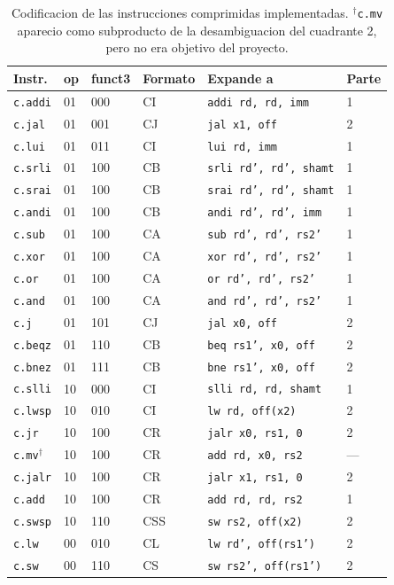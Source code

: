 \documentclass[11pt,a4paper]{article}
\begin{document}
\begin{table}[H]
	\centering
	\small
	\begin{tabular}{@{}llllll@{}}
		\toprule
		\textbf{Instr.} & \textbf{op} & \textbf{funct3} & \textbf{Formato} & \textbf{Expande a} & \textbf{Parte} \\
		\midrule
		\texttt{c.addi} & 01 & 000 & CI  & \texttt{addi rd, rd, imm}       & 1 \\
		\texttt{c.jal}  & 01 & 001 & CJ  & \texttt{jal x1, off}            & 2 \\
		\texttt{c.lui}  & 01 & 011 & CI  & \texttt{lui rd, imm}            & 1 \\
		\texttt{c.srli} & 01 & 100 & CB  & \texttt{srli rd', rd', shamt}   & 1 \\
		\texttt{c.srai} & 01 & 100 & CB  & \texttt{srai rd', rd', shamt}   & 1 \\
		\texttt{c.andi} & 01 & 100 & CB  & \texttt{andi rd', rd', imm}     & 1 \\
		\texttt{c.sub}  & 01 & 100 & CA  & \texttt{sub rd', rd', rs2'}     & 1 \\
		\texttt{c.xor}  & 01 & 100 & CA  & \texttt{xor rd', rd', rs2'}     & 1 \\
		\texttt{c.or}   & 01 & 100 & CA  & \texttt{or rd', rd', rs2'}      & 1 \\
		\texttt{c.and}  & 01 & 100 & CA  & \texttt{and rd', rd', rs2'}     & 1 \\
		\texttt{c.j}    & 01 & 101 & CJ  & \texttt{jal x0, off}            & 2 \\
		\texttt{c.beqz} & 01 & 110 & CB  & \texttt{beq rs1', x0, off}      & 2 \\
		\texttt{c.bnez} & 01 & 111 & CB  & \texttt{bne rs1', x0, off}      & 2 \\
		\texttt{c.slli} & 10 & 000 & CI  & \texttt{slli rd, rd, shamt}     & 1 \\
		\texttt{c.lwsp} & 10 & 010 & CI  & \texttt{lw rd, off(x2)}         & 2 \\
		\texttt{c.jr}   & 10 & 100 & CR  & \texttt{jalr x0, rs1, 0}        & 2 \\
		\texttt{c.mv}$^\dagger$ & 10 & 100 & CR & \texttt{add rd, x0, rs2} & --- \\
		\texttt{c.jalr} & 10 & 100 & CR  & \texttt{jalr x1, rs1, 0}        & 2 \\
		\texttt{c.add}  & 10 & 100 & CR  & \texttt{add rd, rd, rs2}        & 1 \\
		\texttt{c.swsp} & 10 & 110 & CSS & \texttt{sw rs2, off(x2)}        & 2 \\
		\texttt{c.lw}   & 00 & 010 & CL  & \texttt{lw rd', off(rs1')}      & 2 \\
		\texttt{c.sw}   & 00 & 110 & CS  & \texttt{sw rs2', off(rs1')}     & 2 \\
		\bottomrule
	\end{tabular}
	\caption{Codificacion de las instrucciones comprimidas implementadas.
		$^\dagger$\texttt{c.mv} aparecio como subproducto de la desambiguacion del
		cuadrante 2, pero no era objetivo del proyecto.}
	\label{cuadro:encoding}
\end{table}
\end{document}
